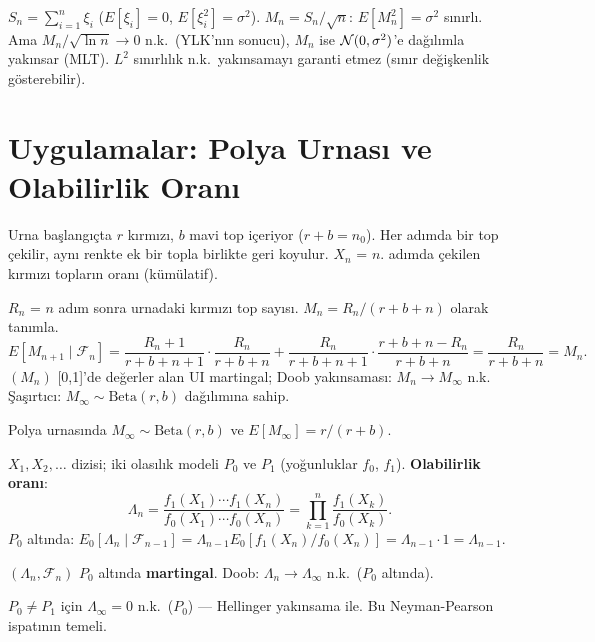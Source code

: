 \begin{ornek}
$S_n = \sum_{i=1}^n \xi_i$ ($E[\xi_i]=0$, $E[\xi_i^2]=\sigma^2$).
$M_n = S_n/\sqrt{n}$: $E[M_n^2] = \sigma^2$ sınırlı.
Ama $M_n/\sqrt{\ln n} \to 0$ n.k.\ (YLK'nın sonucu),
$M_n$ ise $\mathcal{N}(0,\sigma^2)$'e dağılımla yakınsar (MLT).
$L^2$ sınırlılık n.k.\ yakınsamayı garanti etmez (sınır değişkenlik gösterebilir).
\end{ornek}

\section{Uygulamalar: Polya Urnası ve Olabilirlik Oranı}
\label{sec:martingal_uyg}

\begin{ornek}
\label{ex:polya_urna}
Urna başlangıçta $r$ kırmızı, $b$ mavi top içeriyor ($r+b=n_0$). Her adımda bir top çekilir, aynı renkte ek bir topla birlikte geri koyulur. $X_n$ = $n$. adımda çekilen kırmızı topların oranı (kümülatif).

$R_n$ = $n$ adım sonra urnadaki kırmızı top sayısı. $M_n = R_n/(r+b+n)$ olarak tanımla.
\[
  E[M_{n+1}\mid\mathcal{F}_n] = \frac{R_n+1}{r+b+n+1}\cdot\frac{R_n}{r+b+n} + \frac{R_n}{r+b+n+1}\cdot\frac{r+b+n-R_n}{r+b+n} = \frac{R_n}{r+b+n} = M_n.
\]
$(M_n)$ [0,1]'de değerler alan UI martingal; Doob yakınsaması: $M_n\to M_\infty$ n.k. Şaşırtıcı: $M_\infty\sim\mathrm{Beta}(r,b)$ dağılımına sahip.
\end{ornek}

\begin{teorem}
\label{thm:polya_sinir}
Polya urnasında $M_\infty\sim\mathrm{Beta}(r,b)$ ve $E[M_\infty]=r/(r+b)$.
\end{teorem}

\begin{ornek}
\label{ex:ort_martingal}
$X_1,X_2,\ldots$ dizisi; iki olasılık modeli $P_0$ ve $P_1$ (yoğunluklar $f_0$, $f_1$). \textbf{Olabilirlik oranı}:
\[
  \Lambda_n = \frac{f_1(X_1)\cdots f_1(X_n)}{f_0(X_1)\cdots f_0(X_n)} = \prod_{k=1}^n\frac{f_1(X_k)}{f_0(X_k)}.
\]
$P_0$ altında: $E_0[\Lambda_n\mid\mathcal{F}_{n-1}] = \Lambda_{n-1}E_0[f_1(X_n)/f_0(X_n)] = \Lambda_{n-1}\cdot1 = \Lambda_{n-1}$.

$(\Lambda_n,\mathcal{F}_n)$ $P_0$ altında \textbf{martingal}. Doob: $\Lambda_n\to\Lambda_\infty$ n.k.\ ($P_0$ altında).

$P_0\neq P_1$ için $\Lambda_\infty=0$ n.k.\ ($P_0$) --- Hellinger yakınsama ile. Bu Neyman-Pearson ispatının temeli.
\end{ornek}

